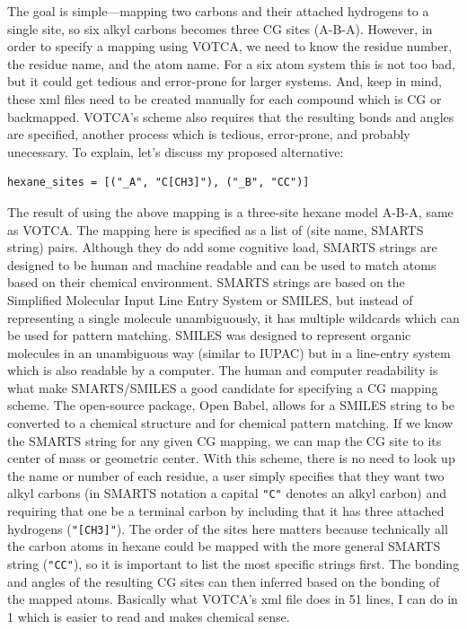 The goal is simple---mapping two carbons and their attached hydrogens to a single site, so six alkyl carbons becomes three CG sites (A-B-A).
However, in order to specify a mapping using VOTCA, we need to know the residue number, the residue name, and the atom name.
For a six atom system this is not too bad, but it could get tedious and error-prone for larger systems.
And, keep in mind, these xml files need to be created manually for each compound which is CG or backmapped.
VOTCA's scheme also requires that the resulting bonds and angles are specified, another process which is tedious, error-prone, and probably unecessary. 
To explain, let's discuss my proposed alternative:
\begin{lstlisting}
hexane_sites = [("_A", "C[CH3]"), ("_B", "CC")]
\end{lstlisting}
The result of using the above mapping is a three-site hexane model A-B-A, same as VOTCA\cite{grits}.
The mapping here is specified as a list of (site name, SMARTS string) pairs.
Although they do add some cognitive load, SMARTS strings are designed to be human and machine readable and can be used to match atoms based on their chemical environment.
SMARTS strings are based on the Simplified Molecular Input Line Entry System or SMILES, but instead of representing a single molecule unambiguously, it has multiple wildcards which can be used for pattern matching\cite{daylight}.
SMILES was designed to represent organic molecules in an unambiguous way (similar to IUPAC) but in a line-entry system which is also readable by a computer\cite{Weininger1988}.
The human and computer readability is what make SMARTS/SMILES a good candidate for specifying a CG mapping scheme.
The open-source package, Open Babel, allows for a SMILES string to be converted to a chemical structure and for chemical pattern matching\cite{openbabel, OBoyle2011}.
If we know the SMARTS string for any given CG mapping, we can map the CG site to its center of mass or geometric center.
With this scheme, there is no need to look up the name or number of each residue, a user simply specifies that they want two alkyl carbons (in SMARTS notation a capital \lstinline{"C"} denotes an alkyl carbon) and requiring that one be a terminal carbon by including that it has three attached hydrogens (\lstinline{"[CH3]"}).
The order of the sites here matters because technically all the carbon atoms in hexane could be mapped with the more general SMARTS string (\lstinline{"CC"}), so it is important to list the most specific strings first.
The bonding and angles of the resulting CG sites can then inferred based on the bonding of the mapped atoms.
Basically what VOTCA's xml file does in 51 lines, I can do in 1 which is easier to read and makes chemical sense. 

